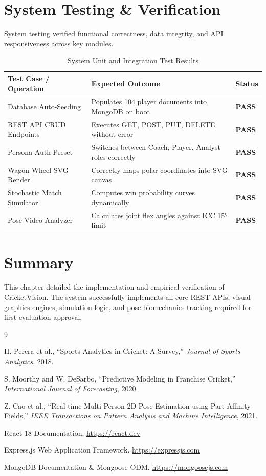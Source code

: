 \documentclass[12pt,a4paper]{report}
\begin{document}
\section{System Testing \& Verification}
System testing verified functional correctness, data integrity, and API responsiveness across key modules.

\begin{table}[H]
\centering
\caption{System Unit and Integration Test Results}
\label{tab:test_results}
\begin{tabular}{lll}
\toprule
\textbf{Test Case / Operation} & \textbf{Expected Outcome} & \textbf{Status} \\
\midrule
Database Auto-Seeding & Populates 104 player documents into MongoDB on boot & \textbf{PASS} \\
REST API CRUD Endpoints & Executes GET, POST, PUT, DELETE without error & \textbf{PASS} \\
Persona Auth Preset & Switches between Coach, Player, Analyst roles correctly & \textbf{PASS} \\
Wagon Wheel SVG Render & Correctly maps polar coordinates into SVG canvas & \textbf{PASS} \\
Stochastic Match Simulator & Computes win probability curves dynamically & \textbf{PASS} \\
Pose Video Analyzer & Calculates joint flex angles against ICC 15° limit & \textbf{PASS} \\
\bottomrule
\end{tabular}
\end{table}

\section{Summary}
This chapter detailed the implementation and empirical verification of CricketVision. The system successfully implements all core REST APIs, visual graphics engines, simulation logic, and pose biomechanics tracking required for first evaluation approval.


\begin{thebibliography}{9}

H. Perera et al., ``Sports Analytics in Cricket: A Survey,'' \textit{Journal of Sports Analytics}, 2018.

S. Moorthy and W. DeSarbo, ``Predictive Modeling in Franchise Cricket,'' \textit{International Journal of Forecasting}, 2020.

Z. Cao et al., ``Real-time Multi-Person 2D Pose Estimation using Part Affinity Fields,'' \textit{IEEE Transactions on Pattern Analysis and Machine Intelligence}, 2021.

React 18 Documentation. \url{https://react.dev}

Express.js Web Application Framework. \url{https://expressjs.com}

MongoDB Documentation \& Mongoose ODM. \url{https://mongoosejs.com}

\end{thebibliography}
\end{document}
